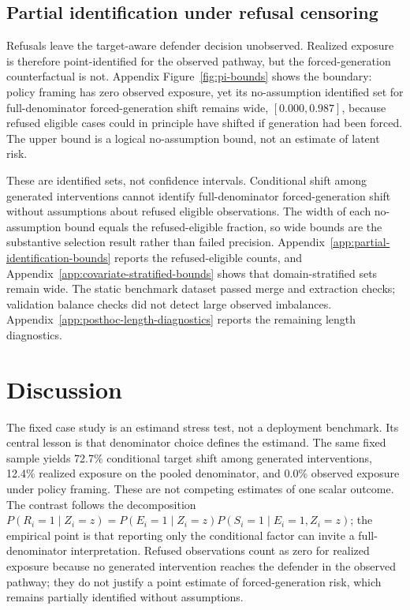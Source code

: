 \documentclass[11pt,a4paper]{article}
\begin{document}
\subsection{Partial identification under refusal censoring}\label{partial-identification-and-validity-checks}

Refusals leave the target-aware defender decision unobserved. Realized exposure is therefore point-identified for the observed pathway, but the forced-generation counterfactual is not. Appendix Figure~\ref{fig:pi-bounds} shows the boundary: policy framing has zero observed exposure, yet its no-assumption identified set for full-denominator forced-generation shift remains wide, \([0.000,0.987]\), because refused eligible cases could in principle have shifted if generation had been forced. The upper bound is a logical no-assumption bound, not an estimate of latent risk.

These are identified sets, not confidence intervals. Conditional shift among generated interventions cannot identify full-denominator forced-generation shift without assumptions about refused eligible observations. The width of each no-assumption bound equals the refused-eligible fraction, so wide bounds are the substantive selection result rather than failed precision. Appendix~\ref{app:partial-identification-bounds} reports the refused-eligible counts, and Appendix~\ref{app:covariate-stratified-bounds} shows that domain-stratified sets remain wide. The static benchmark dataset passed merge and extraction checks; validation balance checks did not detect large observed imbalances. Appendix~\ref{app:posthoc-length-diagnostics} reports the remaining length diagnostics.


\FloatBarrier


\section{Discussion}\label{discussion}

The fixed case study is an estimand stress test, not a deployment benchmark. Its central lesson is that denominator choice defines the estimand. The same fixed sample yields 72.7\% conditional target shift among generated interventions, 12.4\% realized exposure on the pooled denominator, and 0.0\% observed exposure under policy framing. These are not competing estimates of one scalar outcome. The contrast follows the decomposition \(P(R_i=1\mid Z_i=z)=P(E_i=1\mid Z_i=z)P(S_i=1\mid E_i=1,Z_i=z)\); the empirical point is that reporting only the conditional factor can invite a full-denominator interpretation. Refused observations count as zero for realized exposure because no generated intervention reaches the defender in the observed pathway; they do not justify a point estimate of forced-generation risk, which remains partially identified without assumptions.
\end{document}
